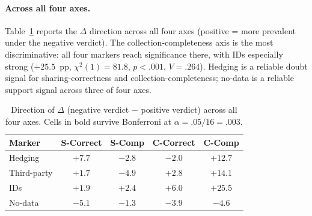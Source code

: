 \documentclass[11pt,a4paper]{article}
\begin{document}
\paragraph{Across all four axes.}
Table~\ref{tab:disc-all} reports the $\Delta$ direction across all
four axes (positive = more prevalent under the negative verdict).
The collection-completeness axis is the most discriminative: all
four markers reach significance there, with IDs especially
strong ($+25.5$~pp, $\chi^{2}(1)=81.8$, $p<.001$, $V=.264$).
Hedging is a reliable doubt signal for sharing-correctness and
collection-completeness; no-data is a reliable support signal across
three of four axes.

\begin{table}[t]
\centering\small
\caption{Direction of $\Delta$ (negative verdict $-$ positive verdict)
across all four axes. Cells in bold survive Bonferroni at
$\alpha=.05/16=.003$.}
\label{tab:disc-all}
\begin{tabular}{lcccc}
\toprule
Marker & S-Correct & S-Comp & C-Correct & C-Comp \\
\midrule
Hedging      & $+7.7$  & $-2.8$  & $-2.0$  & \textbf{$+12.7$} \\
Third-party  & $+1.7$  & $-4.9$  & $+2.8$  & \textbf{$+14.1$} \\
IDs          & $+1.9$  & $+2.4$  & $+6.0$  & \textbf{$+25.5$} \\
No-data      & $-5.1$  & $-1.3$  & $-3.9$  & \textbf{$-4.6$}  \\
\bottomrule
\end{tabular}
\end{table}
\end{document}
